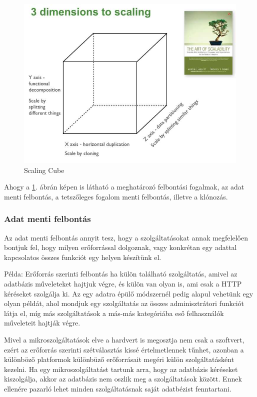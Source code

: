 \documentclass[11pt,magyar,a4paper,twoside,]{report}
\let\Oldincludegraphics\includegraphics
\renewcommand{\includegraphics}[1]{
\begin{adjustbox}{max size={\textwidth}{\textheight}}
    \Oldincludegraphics[scale=0.6]{#1}%
\end{adjustbox}
}
\begin{document}
\begin{figure}[H]
\centering
\includegraphics{img/ScaleCude.jpg}
\caption{Scaling Cube\citep{scale-cube}\label{scalecube}}
\end{figure}

Ahogy a \ref{scalecube}. ábrán képen is látható a meghatározó felbontási
fogalmak, az adat menti felbontás, a tetszőleges fogalom menti
felbontás, illetve a klónozás.

\subsubsection{Adat menti felbontás}\label{adat-menti-felbontuxe1s}

Az adat menti felbontás annyit tesz, hogy a szolgáltatásokat annak
megfelelően bontjuk fel, hogy milyen erőforrással dolgoznak, vagy
konkrétan egy adattal kapcsolatos összes funkciót egy helyen készítünk
el.

Példa: Erőforrás szerinti felbontás ha külön található szolgáltatás,
amivel az adatbázis műveleteket hajtjuk végre, és külön van olyan is,
ami csak a HTTP kéréseket szolgálja ki. Az egy adatra épülő módszernél
pedig alapul vehetünk egy olyan példát, ahol mondjuk egy szolgáltatás az
összes adminisztrátori funkciót látja el, míg más szolgáltatások a
más-más kategóriába eső felhasználók műveleteit hajtják végre.

Mivel a mikroszolgáltatások elve a hardvert is megosztja nem csak a
szoftvert, ezért az erőforrás szerinti szétválasztás kissé
értelmetlennek tűnhet, azonban a különböző platformok különbüző
erőforrásait megéri külön szolgáltatásként kezelni. Ha egy
mikroszolgáltatást tartunk arra, hogy az adatbázis kéréseket
kiszolgálja, akkor az adatbázis nem oszlik meg a szolgáltatások között.
Ennek ellenére pazarló lehet minden szolgáltatásnak saját adatbézist
fenntartani.
\end{document}
